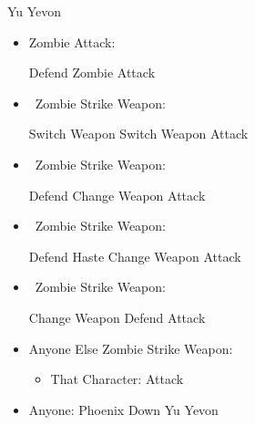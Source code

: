 \begin{battle}[99999]{Yu Yevon}
    \begin{itemize}
        \item Zombie Attack:
        \begin{itemize}
            \yunaf Defend
            \tidusf Zombie Attack
        \end{itemize}
        \item \yuna\ Zombie Strike Weapon:
        \begin{itemize}
            \yunaf Switch Weapon
            \tidusf Switch Weapon
            \yunaf Attack
        \end{itemize}
        \item \tidus\ Zombie Strike Weapon:
        \begin{itemize}
            \yunaf Defend
            \tidusf Change Weapon
            \tidusf Attack
        \end{itemize}
        \item \rikku\ Zombie Strike Weapon:
        \begin{itemize}
            \yunaf Defend
            \tidusf Haste \rikku
            \yunaf Change Weapon
            \rikkuf Attack
        \end{itemize}
        \item \auron\ Zombie Strike Weapon:
        \begin{itemize}
            \switch{\yuna}{\auron}
            \auronf Change Weapon
            \tidusf Defend
            \auronf Attack
        \end{itemize}
        \item Anyone Else Zombie Strike Weapon:
        \begin{itemize}
            \item That Character: Attack
        \end{itemize}
        \item Anyone: Phoenix Down Yu Yevon
    \end{itemize}
\end{battle}
\bothvfill
\colstart